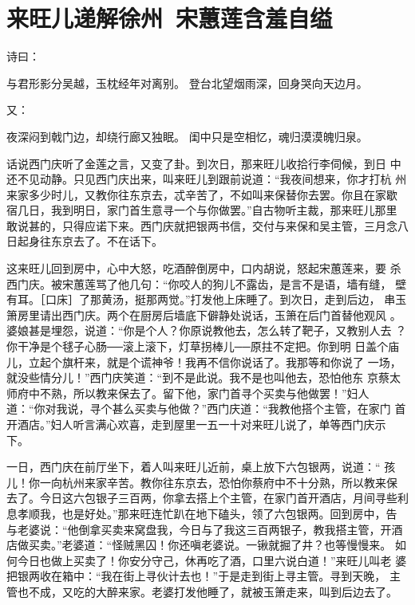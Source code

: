 \chapter{来旺儿递解徐州~宋蕙莲含羞自缢}

诗曰：

与君形影分吴越，玉枕经年对离别。
登台北望烟雨深，回身哭向天边月。

又：

夜深闷到戟门边，却绕行廊又独眠。
闺中只是空相忆，魂归漠漠魄归泉。

话说西门庆听了金莲之言，又变了卦。到次日，那来旺儿收拾行李伺候，到日
中还不见动静。只见西门庆出来，叫来旺儿到跟前说道：“我夜间想来，你才打杭
州来家多少时儿，又教你往东京去，忒辛苦了，不如叫来保替你去罢。你且在家歇
宿几日，我到明日，家门首生意寻一个与你做罢。”自古物听主裁，那来旺儿那里
敢说甚的，只得应诺下来。西门庆就把银两书信，交付与来保和吴主管，三月念八
日起身往东京去了。不在话下。

这来旺儿回到房中，心中大怒，吃酒醉倒房中，口内胡说，怒起宋蕙莲来，要
杀西门庆。被宋蕙莲骂了他几句：“你咬人的狗儿不露齿，是言不是语，墙有缝，
壁有耳。［口床］了那黄汤，挺那两觉。”打发他上床睡了。到次日，走到后边，
串玉箫房里请出西门庆。两个在厨房后墙底下僻静处说话，玉箫在后门首替他观风
。婆娘甚是埋怨，说道：“你是个人？你原说教他去，怎么转了靶子，又教别人去
？你干净是个毬子心肠──滚上滚下，灯草拐棒儿──原拄不定把。你到明
日盖个庙儿，立起个旗杆来，就是个谎神爷！我再不信你说话了。我那等和你说了
一场，就没些情分儿！”西门庆笑道：“到不是此说。我不是也叫他去，恐怕他东
京蔡太师府中不熟，所以教来保去了。留下他，家门首寻个买卖与他做罢！”妇人
道：“你对我说，寻个甚么买卖与他做？”西门庆道：“我教他搭个主管，在家门
首开酒店。”妇人听言满心欢喜，走到屋里一五一十对来旺儿说了，单等西门庆示
下。

一日，西门庆在前厅坐下，着人叫来旺儿近前，桌上放下六包银两，说道：“
孩儿！你一向杭州来家辛苦。教你往东京去，恐怕你蔡府中不十分熟，所以教来保
去了。今日这六包银子三百两，你拿去搭上个主管，在家门首开酒店，月间寻些利
息孝顺我，也是好处。”那来旺连忙趴在地下磕头，领了六包银两。回到房中，告
与老婆说：“他倒拿买卖来窝盘我，今日与了我这三百两银子，教我搭主管，开酒
店做买卖。”老婆道：“怪贼黑囚！你还嗔老婆说。一锹就掘了井？也等慢慢来。
如何今日也做上买卖了！你安分守己，休再吃了酒，口里六说白道！”来旺儿叫老
婆把银两收在箱中：“我在街上寻伙计去也！”于是走到街上寻主管。寻到天晚，
主管也不成，又吃的大醉来家。老婆打发他睡了，就被玉箫走来，叫到后边去了。

